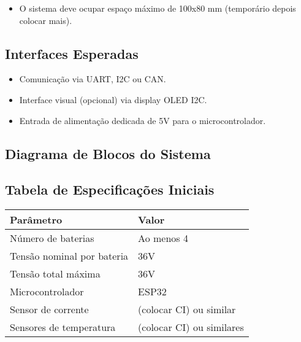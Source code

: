 \documentclass[12pt]{article}
\begin{document}
\begin{itemize}
	\item O sistema deve ocupar espaço máximo de 100x80 mm (temporário depois colocar mais).

\end{itemize}

\subsection{Interfaces Esperadas}

\begin{itemize}
	\item Comunicação via UART, I2C ou CAN.
	\item Interface visual (opcional) via display OLED I2C.
	\item Entrada de alimentação dedicada de 5V para o microcontrolador.
\end{itemize}

\subsection{Diagrama de Blocos do Sistema}

\vspace{1cm}
\begin{center}
\end{center}
\vspace{1cm}

\subsection{Tabela de Especificações Iniciais}

\begin{longtable}{|p{}|p{}|}
	\hline
	\textbf{Parâmetro}         & \textbf{Valor}            \\
	\hline
	Número de baterias         & Ao menos 4                \\
	\hline
	Tensão nominal por bateria & 36V                       \\
	\hline
	Tensão total máxima        & 36V                       \\
	\hline
	Microcontrolador           & ESP32                     \\
	\hline
	Sensor de corrente         & (colocar CI) ou similar   \\
	\hline
	Sensores de temperatura    & (colocar CI) ou similares \\
	\hline
\end{longtable}
\end{document}

